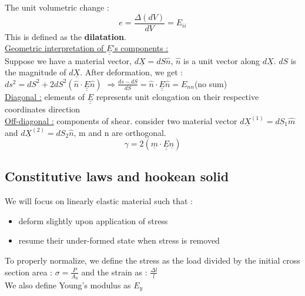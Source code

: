 \documentclass[../main.tex]{subfiles}
\begin{document}
The unit volumetric change : \begin{equation}
    e = \frac{\Delta (dV)}{dV} = E_{ii}
\end{equation}
This is defined as the \textbf{dilatation}.\\

\quad \underline{Geometric interpretation of $\underline{\underline{E}}$'s components :}\\
Suppose we have a material vector, $d\underline{X} = dS \hat{n}$, $\hat{n}$ is a unit vector along $d\underline{X}$. $dS$ is the magnitude of $d\underline{X}$. After deformation, we get : \\
$ds^2 = dS^2+2dS^2(\hat{n}\cdot \underline{\underline{E}} \hat{n})$ $\Rightarrow \frac{ds-dS}{dS} = \hat{n}\cdot \underline{\underline{E}} \hat{n} = E_{nn}$(no sum)\\

\underline{Diagonal :} elements of $\underline{\underline{E}}$ represents unit elongation on their respective coordinates direction \\

\underline{Off-diagonal :} components of shear. consider two material vector $d\underline{X}^{(1)} = dS_1 \hat{m}$ and $d\underline{X}^{(2)} = dS_2 \hat{n}$, m and n are orthogonal.\\
\begin{equation}
    \gamma = 2(\underline{m}\cdot \underline{\underline{E}}\underline{n})
\end{equation}

\subsection{Constitutive laws and hookean solid}
We will focus on linearly elastic material such that : \begin{itemize}
    \item deform slightly upon application of stress\\
    \item resume their under-formed state when stress is removed\\
\end{itemize}

To properly normalize, we define the stress as the load divided by the initial cross section area : $\sigma = \frac{P}{A_0}$ and the strain as : $\frac{\Delta l}{l}$\\
We also define Young's modulus as $E_y$\\
\end{document}
